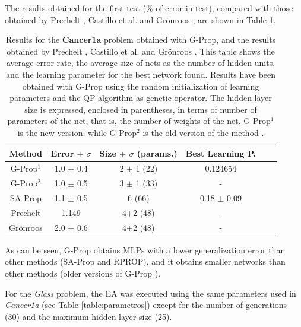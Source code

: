 \documentclass{llncs}
\begin{document}
The results obtained for the first test ($\%$ of error in test), compared with those obtained by Prechelt \cite{Prechelt94c}, Castillo et al. \cite{Castillo1,Castillo2} and Gr\"{o}nroos \cite{MAG98}, are shown in Table \ref{table:cancer}.

\begin{table}[!h]
\begin{center}
\begin{tabular}{|c||c|c|c|c|c|}
\hline 
Method & Error $\pm$ $\sigma$ & Size $\pm$ $\sigma$ (params.) &  Best Learning P. \\
\hline
\hline
G-Prop$^1$   &  1.0  $\pm$ 0.4   &  2 $\pm$ 1  (22)       & 0.124654  \\
\hline
G-Prop$^2$   &  1.0  $\pm$ 0.5   &  3 $\pm$ 1  (33)       & -  \\
\hline
SA-Prop      &  1.1  $\pm$ 0.5   &    6     (66)          & 0.18 $\pm$ 0.09  \\
\hline
Prechelt     &  1.149            &   4+2    (48)          & -  \\
\hline
Gr\"{o}nroos &  2.0 $\pm$ 0.6    &   4+2    (48)          & -  \\ 
\hline
\end{tabular}
\end{center}
\caption{\small{Results for the \textbf{Cancer1a} problem obtained with G-Prop, and the results obtained by Prechelt \cite{Prechelt94c}, Castillo et al. \cite{Castillo1,Castillo2} and Gr\"{o}nroos \cite{MAG98}. This table shows the average error rate, the average size of nets  as the number of hidden units, and the learning parameter for the best network found. Results have been obtained with G-Prop using the random initialization of learning parameters and the QP algorithm as genetic operator. The hidden layer size is expressed, enclosed in parentheses, in terms of number of parameters of the net, that is, the number of weights of the net. G-Prop$^1$ is the new version, while G-Prop$^2$ is the old version of the method \cite{Castillo1}.}}
\label{table:cancer}
\end{table}

As can be seen, G-Prop obtains MLPs with a lower generalization error than other methods (SA-Prop \cite{Castillo2} and RPROP), and it obtains smaller networks than other methods (older versions of G-Prop \cite{Castillo1}).

\medskip

For the \emph{Glass} problem, the EA was executed using the same parameters used in \emph{Cancer1a} (see Table \ref{table:parametros}) except for the number of generations (30) and the maximum hidden layer size (25).
\end{document}
